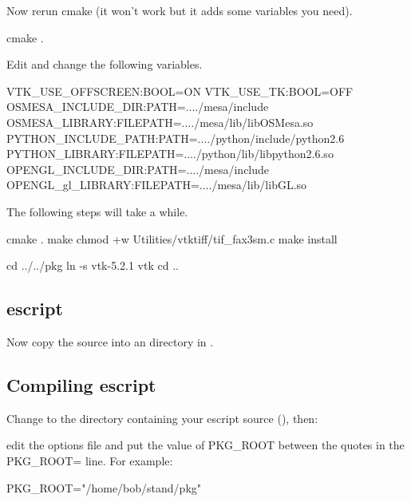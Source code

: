 Now rerun cmake (it won't work but it adds some variables you need).

\begin{shellCode}
cmake .
\end{shellCode}

Edit  and change the following variables.

\begin{shellCode}
VTK_USE_OFFSCREEN:BOOL=ON
VTK_USE_TK:BOOL=OFF
OSMESA_INCLUDE_DIR:PATH=..../mesa/include
OSMESA_LIBRARY:FILEPATH=..../mesa/lib/libOSMesa.so
PYTHON_INCLUDE_PATH:PATH=..../python/include/python2.6
PYTHON_LIBRARY:FILEPATH=..../python/lib/libpython2.6.so
OPENGL_INCLUDE_DIR:PATH=..../mesa/include
OPENGL_gl_LIBRARY:FILEPATH=..../mesa/lib/libGL.so
\end{shellCode}

The following steps will take a while.
\begin{shellCode}
cmake .
make
chmod +w Utilities/vtktiff/tif_fax3sm.c
make install
\end{shellCode}

\begin{shellCode}
cd ../../pkg
ln -s vtk-5.2.1 vtk
cd ..
\end{shellCode}

\subsection{escript}
\label{sec:srclinux-escript}

Now copy the \esfinley source into an  directory in .

\subsection{Compiling escript}\label{sec:compileescriptlinux}

Change to the directory containing your escript source (), then:


edit the options file and put the value of PKG_ROOT between the quotes in the PKG_ROOT= line.
For example:
\begin{shellCode}
PKG_ROOT="/home/bob/stand/pkg"
\end{shellCode}

